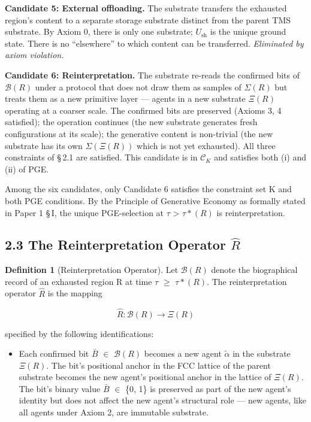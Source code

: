 \documentclass[11pt,oneside]{report}
\theoremstyle{definition}
\newtheorem{definition}[theorem]{Definition}
\theoremstyle{remark}
\begin{document}
\textbf{Candidate 5: External offloading.} The substrate transfers the
exhausted region's content to a separate storage substrate distinct from
the parent TMS substrate. By Axiom 0, there is only one substrate; \ensuremath{U_{\mathrm{sh}}}
is the unique ground state. There is no ``elsewhere'' to which content
can be transferred. \emph{Eliminated by axiom violation.}

\textbf{Candidate 6: Reinterpretation.} The substrate re-reads the
confirmed bits of \ensuremath{\mathcal{B}(R)} under a protocol that does not draw them as
samples of \ensuremath{\Sigma (R)} but treats them as a new primitive layer --- agents in a
new substrate \ensuremath{\Xi (R)} operating at a coarser scale. The confirmed bits are
preserved (Axioms 3, 4 satisfied); the operation continues (the new
substrate generates fresh configurations at its scale); the generative
content is non-trivial (the new substrate has its own \ensuremath{\Sigma (\Xi (R))} which is
not yet exhausted). All three constraints of \S\,2.1 are satisfied. This
candidate is in \ensuremath{\mathcal{C}_{K}} and satisfies both (i) and (ii) of PGE.

Among the six candidates, only Candidate 6 satisfies the constraint set
K and both PGE conditions. By the Principle of Generative Economy as
formally stated in Paper 1 \S\,I, the unique PGE-selection at \ensuremath{\tau}
\textgreater{} \ensuremath{\tau *(R)} is reinterpretation.

\subsection*{2.3 The Reinterpretation Operator \ensuremath{\hat{R}}}

\begin{definition}[Reinterpretation Operator]
Let \ensuremath{\mathcal{B}(R)} denote the
biographical record of an exhausted region R at time \ensuremath{\tau} \ensuremath{\geq} \ensuremath{\tau *(R).} The
reinterpretation operator \ensuremath{\hat{R}} is the mapping
\end{definition}

\begin{equation*}
\hat{R} : \mathcal{B}(R) \to \Xi (R)
\end{equation*}

specified by the following identifications:

\begin{itemize}
\item
  Each confirmed bit \ensuremath{\bar{B}} \ensuremath{\in} \ensuremath{\mathcal{B}(R)} becomes a new agent \ensuremath{\tilde{\alpha}} in the substrate
  \ensuremath{\Xi (R).} The bit's positional anchor in the FCC lattice of the parent
  substrate becomes the new agent's positional anchor in the lattice of
  \ensuremath{\Xi (R).} The bit's binary value \ensuremath{\bar{B}} \ensuremath{\in} \{0, 1\} is preserved as part of the
  new agent's identity but does not affect the new agent's structural
  role --- new agents, like all agents under Axiom 2, are immutable
  substrate.
\end{itemize}
\end{document}
